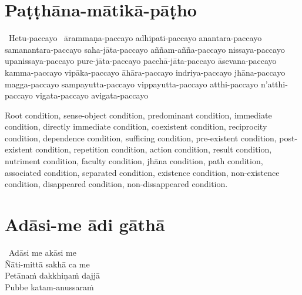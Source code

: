 \suttaRef{[SN 12.1]}

\section{Paṭṭhāna-mātikā-pāṭho}
\label{patthana-matika-patho}

\vspace{-0.8em}

\begin{pali-hang}
  \anglebracketleft\ \hspace{-0.5mm}Hetu-paccayo \hspace{-0.5mm}\anglebracketright\ ārammaṇa-paccayo adhipati-paccayo anantara-paccayo samanantara-paccayo saha-jāta-paccayo aññam-añña-paccayo nissaya-paccayo upanissaya-paccayo pure-jāta-paccayo pacchā-jāta-paccayo āsevana-paccayo kamma-paccayo vipāka-paccayo āhāra-paccayo indriya-paccayo jhāna-paccayo magga-paccayo sampayutta-paccayo vippayutta-paccayo atthi-paccayo n'atthi-paccayo vigata-paccayo avigata-paccayo
\end{pali-hang}

\begin{english-verses}
  Root condition, sense-object condition, predominant condition, immediate condition, directly immediate condition, coexistent condition, reciprocity condition, dependence condition, sufficing condition, pre-existent condition, post-existent condition, repetition condition, action condition, result condition, nutriment condition, faculty condition, jhāna condition, path condition, associated condition, separated condition, existence condition, non-existence condition, disappeared condition, non-dissappeared condition.
\end{english-verses}

\suttaRef{[Dhs A]}

\section{Adāsi-me ādi gāthā}
\label{adasi-me-adi-gatha}

\vspace{-0.8em}

\begin{pali-hang}
\anglebracketleft\ \hspace{-0.5mm}Adāsi me akāsi me \hspace{-0.5mm}\anglebracketright\ \\
Ñāti-mittā sakhā ca me\\
Petānaṁ dakkhiṇaṁ dajjā\\
Pubbe katam-anussaraṁ
\end{pali-hang}

